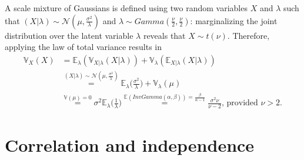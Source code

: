 \documentclass{report}
\begin{document}
\begin{examplebox}
    A scale mixture of Gaussians is defined using two random variables $\displaystyle X$ and $\displaystyle \lambda$ such that $(X|\lambda) \sim \mathcal{N}(\mu, \frac{\sigma^2}{\lambda})$ and $\lambda \sim Gamma(\frac{\nu}{2}, \frac{\nu}{2})$: marginalizing the joint distribution over the latent variable $\displaystyle \lambda$ reveals that $\displaystyle X \sim t(\nu)$. \newline
    Therefore, applying the law of total variance results in
    \begin{align*}
        \mathbb{V}_X(X)
            &= \mathbb{E}_{\lambda}(\mathbb{V}_{X|\lambda}(X|\lambda)) + \mathbb{V}_{\lambda}(\mathbb{E}_{X|\lambda}(X|\lambda)) \\
            &\stackrel{(X|\lambda) \sim \mathcal{N}(\mu, \frac{\sigma^2}{\lambda})}{=} \mathbb{E}_{\lambda}\Bigg(\frac{\sigma^2}{\lambda}\Bigg) + \mathbb{V}_{\lambda}(\mu) \\
            &\stackrel{\mathbb{V}(\mu) = 0}{=} \sigma^2\mathbb{E}_{\lambda}\Bigg(\frac{1}{\lambda}\Bigg) \stackrel{\mathbb{E}(InvGamma(\alpha, \beta)) = \frac{\beta}{\alpha - 1}}{=} \frac{\sigma^2\nu}{\nu - 2} \text{, provided $\nu > 2$.}
    \end{align*}
\end{examplebox}

\chapter{Correlation and independence}
\end{document}
